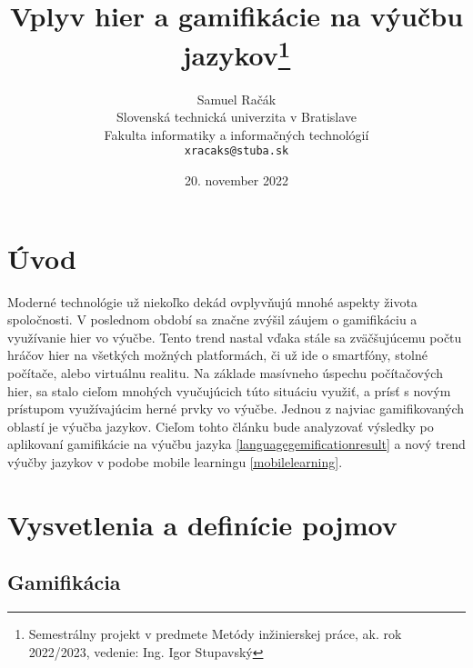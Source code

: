 \documentclass[10pt,slovak,a4paper]{article}
\title{Vplyv hier a gamifikácie na výučbu jazykov\thanks{Semestrálny projekt v predmete Metódy inžinierskej práce, ak. rok 2022/2023, vedenie: Ing. Igor Stupavský}}
\author{Samuel Račák\\[2pt]
	{\small Slovenská technická univerzita v Bratislave}\\
	{\small Fakulta informatiky a informačných technológií}\\
	{\small \texttt{xracaks@stuba.sk}}
	}
\date{\small 20. november 2022} %
\begin{document}
\maketitle


\section{Úvod} \label{Abstract}

Moderné technológie už niekoľko dekád ovplyvňujú mnohé aspekty života spoločnosti. V poslednom období sa značne zvýšil záujem o gamifikáciu a využívanie hier vo výučbe. Tento trend nastal vďaka stále sa zväčšujúcemu počtu hráčov hier na všetkých možných platformách, či už ide o smartfóny, stolné počítače, alebo virtuálnu realitu. Na základe masívneho úspechu počítačových hier, sa stalo cieľom mnohých vyučujúcich túto situáciu využiť, a prísť s novým prístupom využívajúcim herné prvky vo výučbe. 
Jednou z najviac gamifikovaných oblastí je výučba jazykov. Cieľom tohto článku bude analyzovať výsledky po aplikovaní gamifikácie na výučbu jazyka \ref{languagegemificationresult} a nový trend výučby jazykov v podobe mobile learningu \ref{mobilelearning}.


\section{Vysvetlenia a definície pojmov} \label{definitions}

\subsection{Gamifikácia} \label{gamification}
\end{document}

